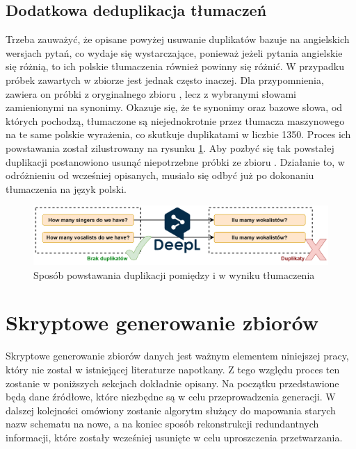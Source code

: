 \subsection{Dodatkowa deduplikacja tłumaczeń}
Trzeba zauważyć, że opisane powyżej usuwanie duplikatów bazuje na angielskich wersjach pytań, co wydaje się wystarczające, ponieważ jeżeli pytania angielskie się różnią, to ich polskie tłumaczenia również powinny się różnić. W przypadku próbek zawartych w zbiorze  jest jednak często inaczej. Dla przypomnienia, zawiera on próbki z oryginalnego zbioru , lecz z wybranymi słowami zamienionymi na synonimy. Okazuje się, że te synonimy oraz bazowe słowa, od których pochodzą, tłumaczone są niejednokrotnie przez tłumacza maszynowego na te same polskie wyrażenia, co skutkuje duplikatami w liczbie 1350. Proces ich powstawania został zilustrowany na rysunku \ref{fig:deduplication-after-translation}. Aby pozbyć się tak powstałej duplikacji postanowiono usunąć niepotrzebne próbki ze zbioru . Działanie to, w odróżnieniu od wcześniej opisanych, musiało się odbyć już po dokonaniu tłumaczenia na język polski.

\begin{figure}[ht!]
  \centering
  \includegraphics[width=1.0\linewidth]{images/duplication_after_translation.png}
  \caption[Sposób powstawania duplikacji w wyniku tłumaczenia]{Sposób powstawania duplikacji pomiędzy  i  w wyniku tłumaczenia}
  \label{fig:deduplication-after-translation}
\end{figure}

\section{Skryptowe generowanie zbiorów}
Skryptowe generowanie zbiorów danych jest ważnym elementem niniejszej pracy, który nie został w istniejącej literaturze napotkany. Z tego względu proces ten zostanie w poniższych sekcjach dokładnie opisany. Na początku przedstawione będą dane źródłowe, które niezbędne są w celu przeprowadzenia generacji. W dalszej kolejności omówiony zostanie algorytm służący do mapowania starych nazw schematu na nowe, a na koniec sposób rekonstrukcji redundantnych informacji, które zostały wcześniej usunięte w celu uproszczenia przetwarzania.


